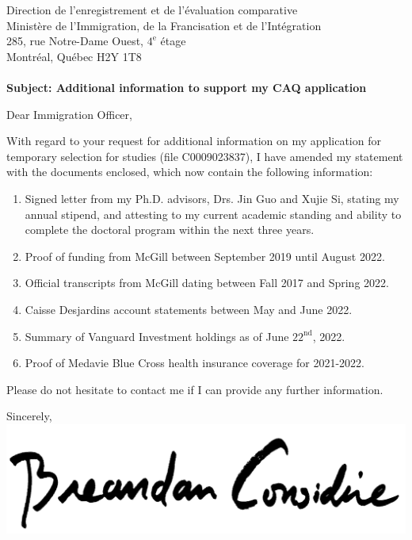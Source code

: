 \documentclass{letter}
\begin{document}
    \begin{letter}{Direction de l'enregistrement et de l'\'evaluation comparative\\
    Minist\`ere de l'Immigration, de la Francisation et de l'Int\'egration\\
    285, rue Notre-Dame Ouest, $4^\text{e}$ \'etage\\
    Montr\'eal, Qu\'ebec H2Y 1T8\\
    \vspace{30pt}\\
    \textbf{Subject: Additional information to support my CAQ application}}
        \opening{Dear Immigration Officer,}
\vspace{10pt}
        With regard to your request for additional information on my application for temporary selection for studies (file C0009023837), I have amended my statement with the documents enclosed, which now contain the following information:

        \begin{enumerate}
         \item Signed letter from my Ph.D. advisors, Drs. Jin Guo and Xujie Si, stating my annual stipend, and attesting to my current academic standing and ability to complete the doctoral program within the next three years.
         \item Proof of funding from McGill between September 2019 until August 2022.
         \item Official transcripts from McGill dating between Fall 2017 and Spring 2022.
         \item Caisse Desjardins account statements between May and June 2022.
         \item Summary of Vanguard Investment holdings as of June $22^{\text{nd}}$, 2022.
         \item Proof of Medavie Blue Cross health insurance coverage for 2021-2022.
        \end{enumerate}

       Please do not hesitate to contact me if I can provide any further information.\\\vspace{10pt}

        \closing{Sincerely,\\
        \includegraphics[scale=0.06]{signature}\\
        }
    \end{letter}
\end{document}
